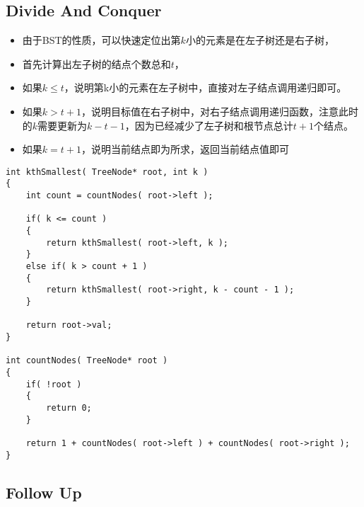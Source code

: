\subsection{Divide And Conquer}

\begin{itemize}
\item 由于BST的性质，可以快速定位出第$k$小的元素是在左子树还是右子树，
\item 首先计算出左子树的结点个数总和$t$，
\item 如果$k\leq t$，说明第k小的元素在左子树中，直接对左子结点调用递归即可。
\item 如果$k>t+1$，说明目标值在右子树中，对右子结点调用递归函数，注意此时的$k$需要更新为$k-t-1$，因为已经减少了左子树和根节点总计$t+1$个结点。
\item 如果$k=t+1$，说明当前结点即为所求，返回当前结点值即可
\end{itemize}

\begin{lstlisting}[style=customc, caption={Divide And Conquer}]
int kthSmallest( TreeNode* root, int k )
{
    int count = countNodes( root->left );

    if( k <= count )
    {
        return kthSmallest( root->left, k );
    }
    else if( k > count + 1 )
    {
        return kthSmallest( root->right, k - count - 1 );
    }

    return root->val;
}

int countNodes( TreeNode* root )
{
    if( !root )
    {
        return 0;
    }

    return 1 + countNodes( root->left ) + countNodes( root->right );
}
\end{lstlisting}
\subsection{Follow Up}

